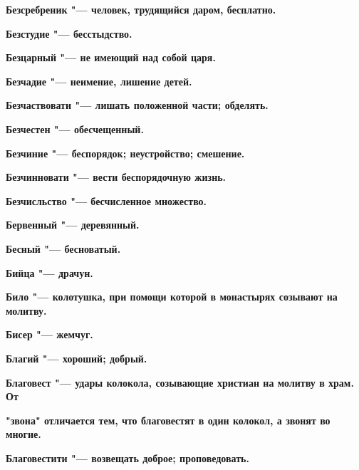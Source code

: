 \bfseries Безсребреник \normalfont{} "--- человек, трудящийся даром, бесплатно. 




\bfseries Безстудие \normalfont{} "--- бесстыдство. 




\bfseries Безцарный \normalfont{} "--- не имеющий над собой царя. 




\bfseries Безчадие \normalfont{} "--- неимение, лишение детей. 




\bfseries Безчаствовати \normalfont{} "--- лишать положенной части; обделять. 




\bfseries Безчестен \normalfont{} "--- обесчещенный. 




\bfseries Безчиние \normalfont{} "--- беспорядок; неустройство; смешение. 




\bfseries Безчинновати \normalfont{} "--- вести беспорядочную жизнь. 




\bfseries Безчисльство \normalfont{} "--- бесчисленное множество. 




\bfseries Бервенный \normalfont{} "--- деревянный. 




\bfseries Бесный \normalfont{} "--- бесноватый. 




\bfseries Бийца \normalfont{} "--- драчун. 




\bfseries Било \normalfont{} "--- колотушка, при помощи которой в монастырях созывают на молитву. 




\bfseries Бисер \normalfont{} "--- жемчуг. 




\bfseries Благий \normalfont{} "--- хороший; добрый. 




\bfseries Благовест \normalfont{} "--- удары колокола, созывающие христиан на молитву в храм. От 




\bfseries "звона" \normalfont{} отличается тем, что благовестят в один колокол, а звонят во многие. 




\bfseries Благовестити \normalfont{} "--- возвещать доброе; проповедовать. 




